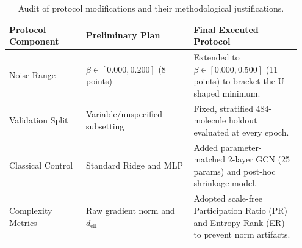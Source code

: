 \documentclass[sn-apacite,Numbered]{sn-jnl}
\begin{document}
\begin{appendices}
\begin{table}[htbp]
\centering
\caption{Audit of protocol modifications and their methodological justifications.}
\label{tab:deviations_audit}
\begin{tabular}{p{0.25\linewidth}p{0.35\linewidth}p{0.35\linewidth}}
\toprule
\textbf{Protocol Component} & \textbf{Preliminary Plan} & \textbf{Final Executed Protocol} \\
\midrule
Noise Range & $\beta \in [0.000, 0.200]$ (8 points) & Extended to $\beta \in [0.000, 0.500]$ (11 points) to bracket the U-shaped minimum. \\
\addlinespace
Validation Split & Variable/unspecified subsetting & Fixed, stratified 484-molecule holdout evaluated at every epoch. \\
\addlinespace
Classical Control & Standard Ridge and MLP & Added parameter-matched 2-layer GCN (25 params) and post-hoc shrinkage model. \\
\addlinespace
Complexity Metrics & Raw gradient norm and $d_{\text{eff}}$ & Adopted scale-free Participation Ratio (PR) and Entropy Rank (ER) to prevent norm artifacts. \\
\bottomrule
\end{tabular}
\end{table}

\end{appendices}
\end{document}
